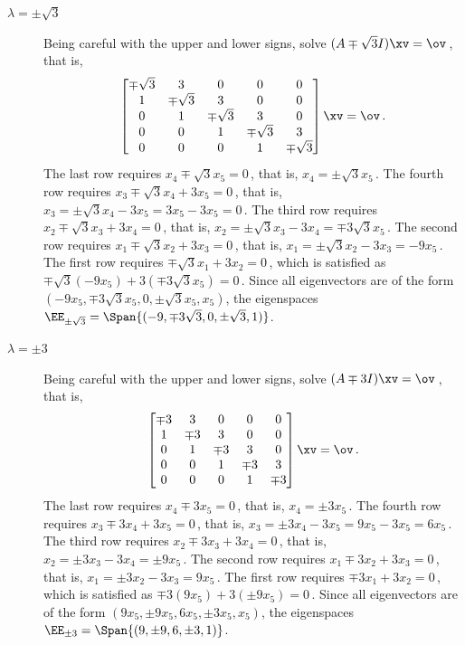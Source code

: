 \begin{example}
\begin{solution}
\begin{enumerate}
\begin{description}
\item[\(\lambda=\pm\sqrt3\)]  Being careful with the upper and lower signs, solve \((A\mp\sqrt3I)\xv=\ov\)\,, that is,
\begin{equation*}
\begin{bmatrix}\mp\sqrt3&3&0&0&0
\\1&\mp\sqrt3&3&0&0
\\0&1&\mp\sqrt3&3&0
\\0&0&1&\mp\sqrt3&3
\\0&0&0&1&\mp\sqrt3\end{bmatrix}\xv=\ov\,.
\end{equation*}
The last row requires \(x_4\mp\sqrt3x_5=0\)\,, that is, \(x_4=\pm\sqrt3x_5\)\,.
The fourth row requires \(x_3\mp\sqrt3x_4+3x_5=0\)\,, that is, \(x_3=\pm\sqrt3x_4-3x_5=3x_5-3x_5=0\)\,.
The third row requires \(x_2\mp\sqrt3x_3+3x_4=0\)\,, that is, \(x_2=\pm\sqrt3x_3-3x_4=\mp3\sqrt3x_5\)\,.
The second row requires \(x_1\mp\sqrt3x_2+3x_3=0\)\,, that is, \(x_1=\pm\sqrt3x_2-3x_3=-9x_5\)\,.
The first row requires \(\mp\sqrt3x_1+3x_2=0\)\,, which is satisfied as \(\mp\sqrt3(-9x_5)+3(\mp3\sqrt3x_5)=0\)\,.
Since all eigenvectors are of the form \((-9x_5, \mp3\sqrt3x_5, 0, \pm\sqrt3x_5, x_5)\), the eigenspaces \(\EE_{\pm\sqrt3}=\Span\{(-9,\mp3\sqrt3,0,\pm\sqrt3,1)\}\).

\item[\(\lambda=\pm3\)]  Being careful with the upper and lower signs, solve \((A\mp3I)\xv=\ov\)\,, that is,
\begin{equation*}
\begin{bmatrix}\mp3&3&0&0&0
\\1&\mp3&3&0&0
\\0&1&\mp3&3&0
\\0&0&1&\mp3&3
\\0&0&0&1&\mp3\end{bmatrix}\xv=\ov\,.
\end{equation*}
The last row requires \(x_4\mp3x_5=0\)\,, that is, \(x_4=\pm3x_5\)\,.
The fourth row requires \(x_3\mp3x_4+3x_5=0\)\,, that is, \(x_3=\pm3x_4-3x_5=9x_5-3x_5=6x_5\)\,.
The third row requires \(x_2\mp3x_3+3x_4=0\)\,, that is, \(x_2=\pm3x_3-3x_4=\pm9x_5\)\,.
The second row requires \(x_1\mp3x_2+3x_3=0\)\,, that is, \(x_1=\pm3x_2-3x_3=9x_5\)\,.
The first row requires \(\mp3x_1+3x_2=0\)\,, which is satisfied as \(\mp3(9x_5)+3(\pm9x_5)=0\)\,.
Since all eigenvectors are of the form \((9x_5, \pm9 x_5, 6x_5, \pm3x_5, x_5)\), the eigenspaces \(\EE_{\pm3}=\Span\{(9,\pm9,6,\pm3,1)\}\).

\end{description}
\end{enumerate}
\end{solution}
\end{example}



